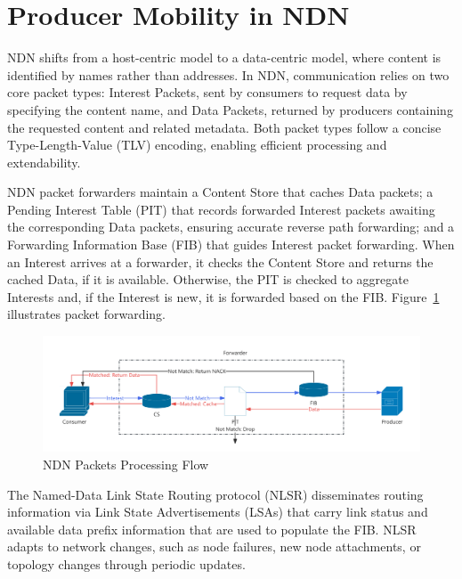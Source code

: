 \documentclass[10pt,conference]{IEEEtran}
\begin{document}
\section{Producer Mobility in NDN}
\label{sec:problem}

NDN shifts from a host-centric model to a data-centric model, where content is identified by names rather than addresses. In NDN, communication relies on two core packet types: Interest Packets, sent by consumers to request data by specifying the content name, and Data Packets, returned by producers containing the requested content and related metadata. Both packet types follow a concise Type-Length-Value (TLV) encoding, enabling efficient processing and extendability.

NDN packet forwarders maintain a Content Store that caches Data packets; a Pending Interest Table (PIT) that records forwarded Interest packets awaiting the corresponding Data packets, ensuring accurate reverse path forwarding; and a Forwarding Information Base (FIB) that guides Interest packet forwarding.
When an Interest arrives at a forwarder, it checks the Content Store and returns the cached Data, if it is available. Otherwise, the PIT is checked to aggregate Interests and, if the Interest is new, it is forwarded based on the FIB. Figure~\ref{fig:NDN Packets Processing Flow} illustrates packet forwarding.

\begin{figure}[t]
    \centering
    \includegraphics[width=1\linewidth]{figures/NDN_Packets_Processing_Flow.pdf}
    \caption{NDN Packets Processing Flow}
    \label{fig:NDN Packets Processing Flow}
\end{figure}

The Named-Data Link State Routing protocol (NLSR) disseminates routing information via Link State Advertisements (LSAs) that carry link status and available data prefix information that are used to populate the FIB. NLSR adapts to network changes, such as node failures, new node attachments, or topology changes through periodic updates.
\end{document}
